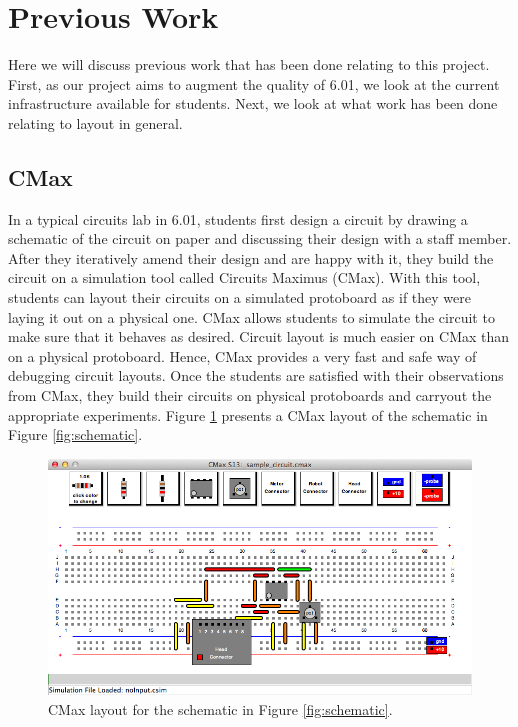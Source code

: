 \section{Previous Work}

Here we will discuss previous work that has been done relating to this project.
First, as our project aims to augment the quality of 6.01, we look at the
current infrastructure available for students. Next, we look at what work has
been done relating to layout in general.

\subsection{CMax}

In a typical circuits lab in 6.01, students first design a circuit by drawing a
schematic of the circuit on paper and discussing their design with a staff
member. After they iteratively amend their design and are happy with it, they
build the circuit on a simulation tool called Circuits Maximus (CMax)\cite{cmax}.
With this
tool, students can layout their circuits on a simulated protoboard as if they
were laying it out on a physical one. CMax allows students to simulate the circuit
to make sure that it behaves as desired. Circuit layout is much easier on CMax
than on a physical protoboard. Hence, CMax provides a very fast and safe way of
debugging circuit layouts. Once the students are satisfied with their
observations from CMax, they build their circuits on physical protoboards and
carryout the appropriate experiments. Figure \ref{fig:cmax_sample} presents a
CMax layout of the schematic in Figure \ref{fig:schematic}.

\begin{figure}
\begin{center}
\includegraphics[width=\textwidth]{Images/sample_circuit.png}
\caption{CMax layout for the schematic in Figure \ref{fig:schematic}.}
\label{fig:cmax_sample}
\end{center}
\end{figure}

